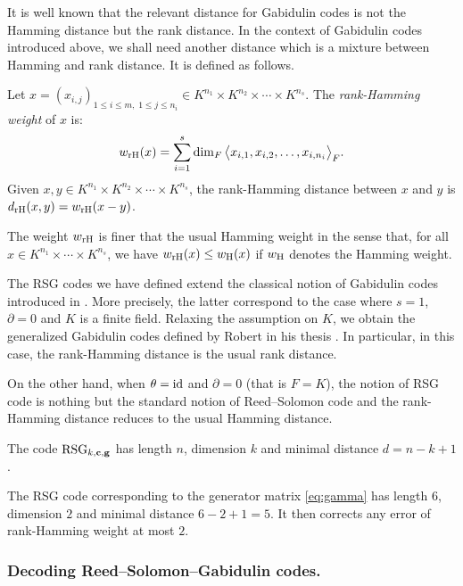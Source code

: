 \documentclass[a4paper]{llncs}
\newcommand{\id}{\textrm{\rm id}}
\newcommand{\bc}{\textbf{c}}
\newcommand{\bg}{\textbf{g}}
\newcommand{\RSG}{\textrm{\rm RSG}}
\newcommand{\wH}{w_{\textrm{\rm H}}}
\newcommand{\wrH}{w_{\textrm{\rm rH}}}
\newcommand{\drH}{d_{\textrm{\rm rH}}}
\begin{document}
It is well known that the relevant distance for Gabidulin codes is not 
the Hamming distance but the rank distance. In the context of Gabidulin 
codes introduced above, we shall need another distance which is a 
mixture between Hamming and rank distance. It is defined as follows.

\begin{definition}
Let $x = (x_{i,j})_{1 \leq i \leq m, \; 1 \leq j \leq n_i} \in
K^{n_1} \times K^{n_2} \times \cdots \times K^{n_s}$.
The \emph{rank-Hamming weight} of $x$ is:
$$\wrH(x) = 
\sum_{i=1}^s \dim_F \big< x_{i,1}, x_{i,2}, \ldots, x_{i,{n_i}} \big>_F.$$
Given $x, y \in K^{n_1} \times K^{n_2} \times \cdots \times K^{n_s}$, 
the {rank-Hamming distance} between $x$ and $y$ is $\drH(x,y) = 
\wrH(x-y)$.
\end{definition}

\begin{remark}
The weight $\wrH$ is finer that the usual Hamming weight in the 
sense that, for all $x \in K^{n_1} \times \cdots \times K^{n_s}$, 
we have $\wrH(x) \leq \wH(x)$ if $\wH$ denotes the Hamming weight.
\end{remark}

The RSG codes we have defined extend the classical notion of Gabidulin 
codes introduced in \cite{gabidulin}. More precisely, the latter correspond to 
the case where $s = 1$, $\partial = 0$ and $K$ is a finite field. 
Relaxing the assumption on $K$, we obtain the generalized Gabidulin 
codes defined by Robert in his thesis \cite{robert}. In particular, in this 
case, the rank-Hamming distance is the usual rank distance.

On the other hand, when $\theta = \id$ and $\partial = 0$ (that is $F = 
K$), the notion of RSG code is nothing but the standard notion of 
Reed--Solomon code and the rank-Hamming distance reduces to the 
usual Hamming distance.

\begin{proposition}
\label{prop:mindist}
The code $\RSG_{k,\bc,\bg}$ has length $n$,
dimension $k$ and minimal distance $d = n - k + 1$.
\end{proposition}

{\small
\begin{example}
The RSG code corresponding to the generator matrix \eqref{eq:gamma}
has length $6$, dimension $2$ and minimal distance $6-2+1 = 5$. It
then corrects any error of rank-Hamming weight at most $2$.
\end{example}}

\subsubsection*{Decoding Reed--Solomon--Gabidulin codes.}
\end{document}
